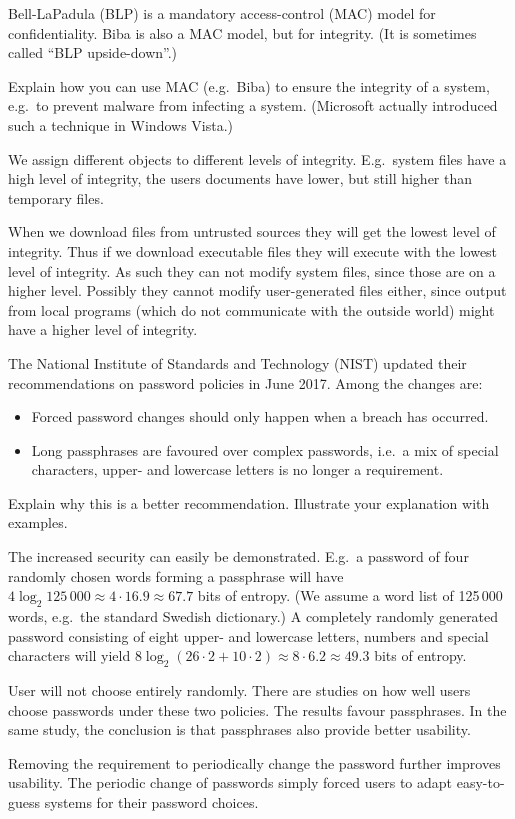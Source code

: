 \question[3]
Bell-LaPadula (BLP) is a mandatory access-control (MAC) model for 
confidentiality.
Biba is also a MAC model, but for integrity.
(It is sometimes called \enquote{BLP upside-down}.)

Explain how you can use MAC (e.g.\ Biba) to ensure the integrity of a system, 
e.g.\ to prevent malware from infecting a system.
(Microsoft actually introduced such a technique in Windows Vista.)

\begin{solution}
  We assign different objects to different levels of integrity.
  E.g.\ system files have a high level of integrity, the users documents have 
  lower, but still higher than temporary files.

  When we download files from untrusted sources they will get the lowest level 
  of integrity.
  Thus if we download executable files they will execute with the lowest level 
  of integrity.
  As such they can not modify system files, since those are on a higher level.
  Possibly they cannot modify user-generated files either, since output from 
  local programs (which do not communicate with the outside world) might have a 
  higher level of integrity.
\end{solution}


\question[3]
  The National Institute of Standards and Technology (NIST) updated their 
  recommendations on password policies in June 2017.
  Among the changes are:
  \begin{itemize}
    \item Forced password changes should only happen when a breach has 
    occurred.
    \item Long passphrases are favoured over complex passwords, i.e.\ a mix of 
    special characters, upper- and lowercase letters is no longer a 
    requirement.
  \end{itemize}
  Explain why this is a better recommendation.
  Illustrate your explanation with examples.

  \begin{solution}
    The increased security can easily be demonstrated.
    E.g.\ a password of four randomly chosen words forming a passphrase will 
    have \(4\log_2 125\,000 \approx 4\cdot 16.9 \approx 67.7\) bits of entropy.
    (We assume a word list of 125\,000 words, e.g.\ the standard Swedish 
    dictionary.)
    A completely randomly generated password consisting of eight upper- and 
    lowercase letters, numbers and special characters will yield 
    \(8\log_2(26\cdot 2 + 10\cdot 2) \approx 8\cdot 6.2 \approx 49.3\) bits of 
    entropy.

    User will not choose entirely randomly.
    There are studies on how well users choose passwords under these two 
    policies.
    The results favour passphrases.
    In the same study, the conclusion is that passphrases also provide better 
    usability.

    Removing the requirement to periodically change the password further 
    improves usability.
    The periodic change of passwords simply forced users to adapt easy-to-guess 
    systems for their password choices.
  \end{solution}

